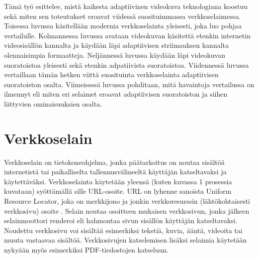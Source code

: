 \documentclass[finnish, 12pt, a4paper, elec, utf8, a-1b, online]{aaltothesis}
\begin{document}
  Tämä työ esittelee, mistä kaikesta adaptiivinen videokuva teknologiana koostuu sekä miten sen toteutukset eroavat viidessä suosituimmassa verkkoselaimessa. Toisessa luvussa käsitellään modernia verkkoselainta yleisesti, joka luo pohjaa vertailulle. Kolmannessa luvussa avataan videokuvan käsitettä etenkin internetin videosisällön kannalta ja käydään läpi adaptiivisen striimauksen kannalta olennaisimpia formaatteja. Neljännessä luvussa käydään läpi videokuvan suoratoistoa yleisesti sekä etenkin adpatiivista suoratoistoa. Viidennessä luvussa vertaillaan tämän hetken viittä suosituinta verkkoselainta adaptiivisen suoratoiston osalta. Viimeisessä luvussa pohditaan, mitä havaintoja vertailussa on ilmennyt eli miten eri selaimet eroavat adaptiivisen suoratoiston ja siihen liittyvien ominaisuuksien osalta.

\clearpage



\section{Verkkoselain}

Verkkoselain on tietokoneohjelma, jonka päätarkoitus on noutaa sisältöä internetistä tai paikalliselta tallennusvälineeltä käyttäjän katseltavaksi ja käytettäväksi. Verkkoselainta käytetään yleensä (kuten kuvassa 1 prosessia kuvataan) syöttämällä sille URL-osoite. URL on lyhenne sanoista Uniform Resource Locator, joka on merkkijono ja jonkin verkkoresurssin (lähtökohtaisesti verkkosivu) osoite \cite{URL}. Selain noutaa osoitteen mukaisen verkkosivun, jonka jälkeen selainmoottori renderoi eli hahmontaa sivun sisällön käyttäjän katseltavaksi. Noudettu verkkosivu voi sisältää esimerkiksi tekstiä, kuvia, ääntä, videoita tai muuta vastaavaa sisältöä. Verkkosivujen katselemisen lisäksi selaimia käytetään nykyään myös esimerkiksi PDF-tiedostojen katseluun.
\end{document}
